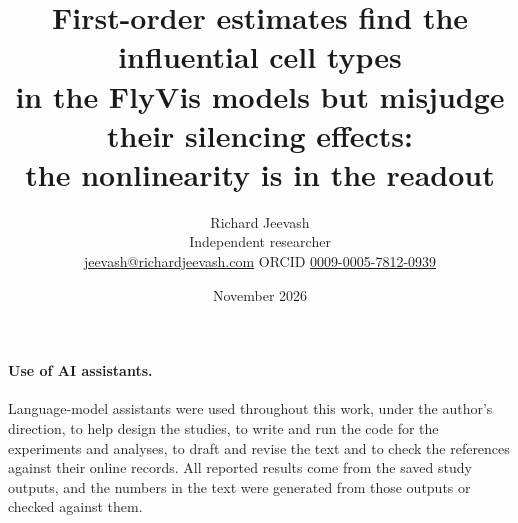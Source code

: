 \documentclass[11pt]{article}
\title{\textbf{First-order estimates find the influential cell types\\ in the FlyVis models but misjudge their silencing effects:\\ the nonlinearity is in the readout}}
\author{Richard Jeevash\\[2pt]
\small Independent researcher\\
\small \href{mailto:jeevash@richardjeevash.com}{jeevash@richardjeevash.com}\quad
ORCID \href{https://orcid.org/0009-0005-7812-0939}{0009-0005-7812-0939}}
\date{November 2026}
\renewcommand{\bottomfraction}{0.8}
\renewcommand{\floatpagefraction}{0.8}
\begin{document}
\maketitle
\vspace{-2em}

\begin{abstract}
\noindent

\end{abstract}








\paragraph{Use of AI assistants.}
Language-model assistants were used throughout this work, under the author's direction, to help design the studies, to write and run the code for the experiments and analyses, to draft and revise the text and to check the references against their online records. All reported results come from the saved study outputs, and the numbers in the text were generated from those outputs or checked against them.

\FloatBarrier



\appendix
\let\FloatBarrier\relax
{}
\renewcommand{\floatpagefraction}{0.6}
\renewcommand{\bottomfraction}{0.9}

\end{document}
